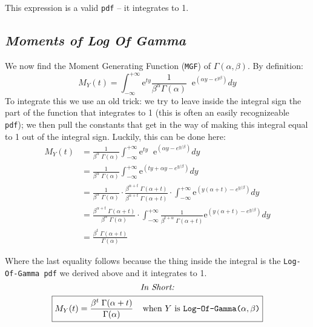 \documentclass[12pt]{article}
\begin{document}
This expression  is a valid \texttt{pdf} -- it integrates to 1. 

\bigskip 
\bigskip 
\subsection*{\color{TealBlue}\emph{Moments of Log Of Gamma}}

We now find the Moment Generating Function (\texttt{MGF}) of $\Gamma(\alpha, \beta)$. By definition:
$$
M_Y(t) = \int_{-\infty}^{+\infty} \mathrm{e}^{ty} \frac{1}{\beta^\alpha \Gamma(\alpha)} \;\; \mathrm{e}^{\left(\alpha y - e^{y\beta}\right)} dy
$$
To integrate this we use an old trick: we try to leave inside the integral sign the part of the function that integrates to 1 (this is often an easily recognizeable \texttt{pdf}); we then pull the constants that get in the way of making this integral equal to 1 out of the integral sign. Luckily, this can be done here:
\begin{align*}
M_Y(t) &= \frac{1}{\beta^\alpha \; \Gamma(\alpha)} \int_{-\infty}^{+\infty} \mathrm{e}^{ty} \;\; \mathrm{e}^{\left(\alpha y - e^{y/\beta}\right)} dy\\
&= \frac{1}{\beta^\alpha \; \Gamma(\alpha)} \int_{-\infty}^{+\infty} \mathrm{e}^{\left(ty +\alpha y - e^{y/\beta}\right)} dy\\
&= \frac{1}{\beta^\alpha \; \Gamma(\alpha)} \cdot \frac{\beta^{\alpha + t} \; \Gamma(\alpha + t)}{\beta^{\alpha + t} \; \Gamma(\alpha + t)} \cdot \int_{-\infty}^{+\infty} \mathrm{e}^{\left(y(\alpha + t) - e^{y/\beta}\right)} dy\\
&= \frac{ \beta^{\alpha + t} \; \Gamma(\alpha + t) }{\beta^\alpha \; \Gamma(\alpha)}  \cdot \int_{-\infty}^{+\infty} \frac{1}{\beta^{t+\alpha} \; \Gamma(\alpha + t)} \mathrm{e}^{\left(y(\alpha + t) - e^{y/\beta}\right)} dy\\
&= \frac{\beta^t \; \Gamma(\alpha + t)}{\Gamma(\alpha)} 
\end{align*}

Where the last equality follows because the thing inside the integral is the \texttt{Log-Of-Gamma pdf} we derived above and it integrates to 1.
\bigskip
$$\text{\emph{In Short:}}$$
$$
\boxed{M_Y(t) = \frac{\beta^t \; \Gamma(\alpha + t)}{\Gamma(\alpha)}   \; \; \; \; \text{when $Y$ is \texttt{Log-Of-Gamma($\alpha, \beta$)}} }
$$

\bigskip 
\bigskip 
\end{document}
